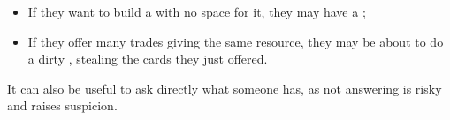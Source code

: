 \documentclass[12pt]{article}
\begin{document}
\begin{itemize}
\begin{itemize}[noitemsep]
        \item If they want to build a  with no space for it, they may have a ;
        \item If they offer many trades giving the same resource, they may be about to do a dirty , stealing the cards they just offered.
    \end{itemize}
    \vspace{-0.3cm}
    It can also be useful to ask directly what  someone has, as not answering is risky and raises suspicion.
\end{itemize}
\end{document}
